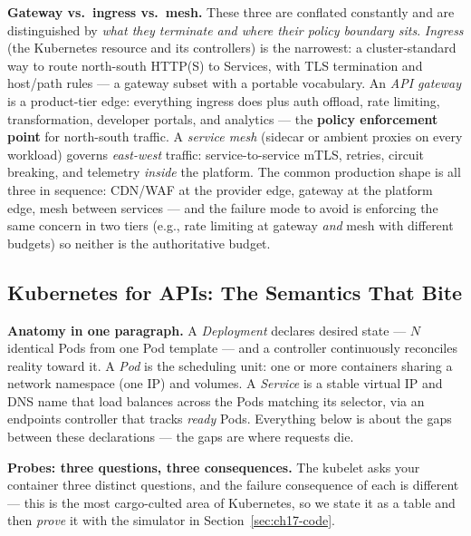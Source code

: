 \textbf{Gateway vs.\ ingress vs.\ mesh.} These three are conflated
constantly and are distinguished by \emph{what they terminate and where
their policy boundary sits}. \emph{Ingress} (the Kubernetes resource and
its controllers) is the narrowest: a cluster-standard way to route
north-south HTTP(S) to Services, with TLS termination and host/path
rules --- a gateway subset with a portable vocabulary. An \emph{API
gateway} is a product-tier edge: everything ingress does plus auth
offload, rate limiting, transformation, developer portals, and
analytics --- the \textbf{policy enforcement point} for north-south
traffic. A \emph{service mesh} (sidecar or ambient proxies on every
workload) governs \emph{east-west} traffic: service-to-service mTLS,
retries, circuit breaking, and telemetry \emph{inside} the platform. The
common production shape is all three in sequence: CDN/WAF at the
provider edge, gateway at the platform edge, mesh between services ---
and the failure mode to avoid is enforcing the same concern in two tiers
(e.g., rate limiting at gateway \emph{and} mesh with different budgets)
so neither is the authoritative budget.

\subsection{Kubernetes for APIs: The Semantics That Bite}
\label{sec:ch17-k8s}

\textbf{Anatomy in one paragraph.} A \emph{Deployment} declares desired
state --- $N$ identical Pods from one Pod template --- and a controller
continuously reconciles reality toward it. A \emph{Pod} is the scheduling
unit: one or more containers sharing a network namespace (one IP) and
volumes. A \emph{Service} is a stable virtual IP and DNS name that load
balances across the Pods matching its selector, via an endpoints
controller that tracks \emph{ready} Pods. Everything below is about the
gaps between these declarations --- the gaps are where requests die.

\textbf{Probes: three questions, three consequences.} The kubelet asks
your container three distinct questions, and the failure consequence of
each is different --- this is the most cargo-culted area of Kubernetes,
so we state it as a table and then \emph{prove} it with the simulator in
Section~\ref{sec:ch17-code}.

